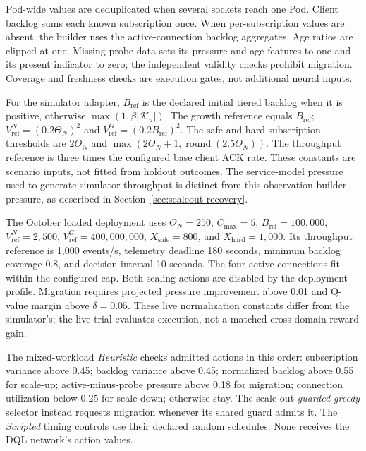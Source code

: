 Pod-wide values are deduplicated when several sockets reach one Pod.
Client backlog sums each known subscription once. When per-subscription
values are absent, the builder uses the active-connection backlog aggregates.
Age ratios are clipped at one. Missing probe data sets its pressure and age
features to one and its present indicator to zero; the independent validity
checks prohibit migration. Coverage and freshness checks are execution gates,
not additional neural inputs.

For the simulator adapter, $B_{\mathrm{ref}}$ is the declared initial tiered
backlog when it is positive, otherwise $\max(1,\beta|\mathcal K_u|)$.
The growth reference equals $B_{\mathrm{ref}}$;
$V^N_{\mathrm{ref}}=(0.2\Theta_N)^2$ and
$V^G_{\mathrm{ref}}=(0.2B_{\mathrm{ref}})^2$.
The safe and hard subscription thresholds are $2\Theta_N$ and
$\max(2\Theta_N+1,\operatorname{round}(2.5\Theta_N))$.
The throughput reference is three times the configured base client ACK rate.
These constants are scenario inputs, not fitted from holdout outcomes.
The service-model pressure used to generate simulator throughput is distinct
from this observation-builder pressure, as described in
Section~\ref{sec:scaleout-recovery}.

The October loaded deployment uses $\Theta_N=250$, $C_{\max}=5$,
$B_{\mathrm{ref}}=100{,}000$, $V^N_{\mathrm{ref}}=2{,}500$,
$V^G_{\mathrm{ref}}=400{,}000{,}000$, $X_{\mathrm{safe}}=800$, and
$X_{\mathrm{hard}}=1{,}000$. Its throughput reference is 1,000 events/s,
telemetry deadline 180 seconds, minimum backlog coverage 0.8, and decision
interval 10 seconds. The four active connections fit within the configured
cap. Both scaling actions are disabled by the deployment profile. Migration
requires projected pressure improvement above 0.01 and Q-value margin above
$\delta=0.05$. These live normalization constants differ from the simulator's;
the live trial evaluates execution, not a matched cross-domain reward gain.

The mixed-workload \emph{Heuristic} checks admitted actions in this order:
subscription variance above 0.45; backlog variance above 0.45; normalized
backlog above 0.55 for scale-up; active-minus-probe pressure above 0.18 for
migration; connection utilization below 0.25 for scale-down; otherwise stay.
The scale-out \emph{guarded-greedy} selector instead requests migration whenever
its shared guard admits it. The \emph{Scripted} timing controls use their
declared random schedules. None receives the DQL network's action values.
